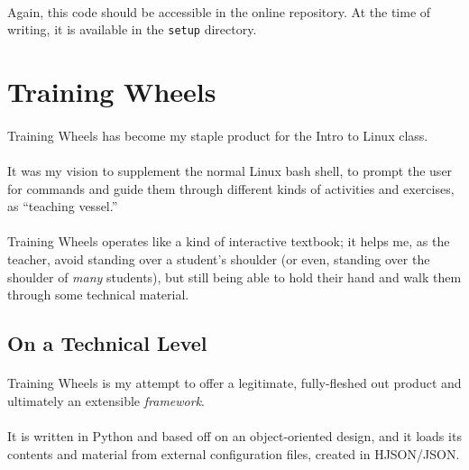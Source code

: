 \documentclass[11pt]{article}
\begin{document}
	\paragraph{} Again, this code should be accessible in the online repository. At the time of writing, it is available in the \texttt{setup} directory.

	\section{Training Wheels}


	\paragraph{} Training Wheels has become my staple product for the Intro to Linux class. 

	\paragraph{} It was my vision to supplement the normal Linux bash shell, to prompt the user for commands and guide them through different kinds of activities and exercises, as ``teaching vessel.''

	\paragraph{} Training Wheels operates like a kind of interactive textbook; it helps me, as the teacher, avoid standing over a student's shoulder (or even, standing over the shoulder of \textit{many} students), but still being able to hold their hand and walk them through some technical material.

	\subsection{On a Technical Level}

	\paragraph{} Training Wheels is my attempt to offer a legitimate, fully-fleshed out product and ultimately an extensible \textit{framework}. 

	\paragraph{} It is written in Python and based off on an object-oriented design, and it loads its contents and material from external configuration files, created in HJSON/JSON.
\end{document}
